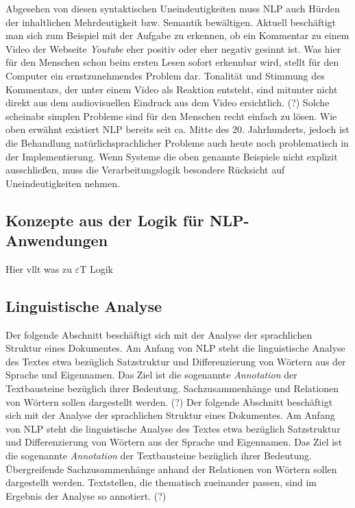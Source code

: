 \documentclass[12pt]{paper}
\begin{document}
Abgesehen von diesen syntaktischen Uneindeutigkeiten muss NLP auch Hürden der inhaltlichen Mehrdeutigkeit bzw. Semantik bewältigen. Aktuell beschäftigt man sich zum Beispiel mit der Aufgabe zu erkennen, ob ein Kommentar zu einem Video der Webseite \textit{Youtube} eher positiv oder eher negativ gesinnt ist. Was hier für den Menschen schon beim ersten Lesen sofort erkennbar wird, stellt für den Computer ein ernstzunehmendes Problem dar. Tonalität und Stimmung des Kommentars, der unter einem Video als Reaktion entsteht, sind mitunter nicht direkt aus dem audiovisuellen Eindruck aus dem Video ersichtlich. (?)
Solche scheinabr simplen Probleme sind für den Menschen recht einfach zu lösen. Wie oben erwähnt existiert NLP bereits seit ca. Mitte des 20. Jahrhunderts, jedoch ist die Behandlung natürlichsprachlicher Probleme auch heute noch problematisch in der Implementierung. Wenn Systeme die oben genannte Beispiele nicht explizit ausschließen, muss die Verarbeitungslogik besondere Rücksicht auf Uneindeutigkeiten nehmen.

\subsection{Konzepte aus der Logik für NLP-Anwendungen}
Hier vllt was zu $\varepsilon$T Logik

\subsection{Linguistische Analyse}
Der folgende Abschnitt beschäftigt sich mit der Analyse der sprachlichen Struktur eines Dokumentes. Am Anfang von NLP steht die linguistische Analyse des Textes etwa bezüglich Satzstruktur und Differenzierung von Wörtern aus der Sprache und Eigennamen. Das Ziel ist die sogenannte \textit{Annotation} der Textbausteine bezüglich ihrer Bedeutung. Sachzusammenhänge und Relationen von Wörtern sollen dargestellt werden. (?)
Der folgende Abschnitt beschäftigt sich mit der Analyse der sprachlichen Struktur eines Dokumentes. Am Anfang von NLP steht die linguistische Analyse des Textes etwa bezüglich Satzstruktur und Differenzierung von Wörtern aus der Sprache und Eigennamen. Das Ziel ist die sogenannte \textit{Annotation} der Textbausteine bezüglich ihrer Bedeutung. Übergreifende Sachzusammenhänge anhand der Relationen von Wörtern sollen dargestellt werden. Textstellen, die thematisch zueinander passen, sind im Ergebnis der Analyse so annotiert. (?)
\end{document}
